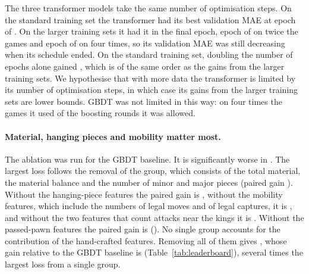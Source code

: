 \documentclass[11pt]{article}
\begin{document}
The three transformer models take the same number of optimisation steps. On
the standard training set the transformer had its best validation MAE at
epoch  of
. On the larger training sets it had it
in the final epoch, epoch 
of  on twice the games and epoch
 of
 on four times, so its
validation MAE was still decreasing when its schedule ended.
\ifchangeepochs
On the standard training set, doubling the number of epochs alone gained
, which is
of the same order as the gains from the larger training sets.
\fi
We hypothesise that with more data the transformer is limited by its number
of optimisation steps, in which case its gains from the larger training sets
are lower bounds. GBDT was not limited in this way: on four times the games
it used  of the 
boosting rounds it was allowed.
\fi



\iffeatures
\paragraph{Material, hanging pieces and mobility matter most.}
The ablation was run for the GBDT baseline. It is significantly worse in
. The largest loss follows the removal of
the  group, which consists of the total
material, the material balance and the number of minor and major pieces
(paired gain ). Without the
hanging-piece features the paired gain is
, without the mobility features,
which include the numbers of legal moves and of legal captures, it is
, and without the two features
that count attacks near the kings it is
. Without the passed-pawn features
the paired gain is 
(). No single group accounts for
the contribution of the hand-crafted features. Removing all of them gives
, whose gain relative to the GBDT baseline is
 (Table~\ref{tab:leaderboard}), several times the
largest loss from a single group.
\fi
\fi
\end{document}

